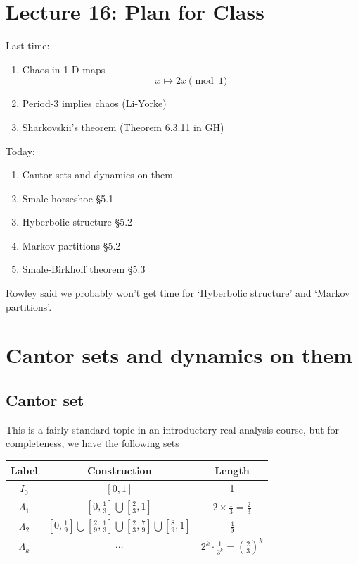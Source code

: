 \documentclass{article}
\begin{document}
\section{Lecture 16: Plan for Class}
Last time:
\begin{enumerate}
    \item Chaos in 1-D maps \[ x\mapsto 2x \pmod 1 \]
    \item Period-3 implies chaos (Li-Yorke)
    \item Sharkovskii's theorem (Theorem 6.3.11 in GH)
\end{enumerate}

Today:
\begin{enumerate}
    \item Cantor-sets and dynamics on them 
    \item Smale horseshoe \S 5.1
    \item Hyberbolic structure \S 5.2
    \item Markov partitions \S 5.2
    \item Smale-Birkhoff theorem \S 5.3
\end{enumerate}
Rowley said we probably won't get time for `Hyberbolic structure' and `Markov partitions'.

\section{Cantor sets and dynamics on them}

\subsection{Cantor set}

This is a fairly standard topic in an introductory real analysis course, but for completeness, we have the following sets 

\begin{table}[h!]
    \centering
    \begin{tabular}{|c|c|c|}
    \hline
    Label & Construction & Length \\
    \hline
    $I_0$ & $[0,1]$ & 1 \\
    $\Lambda_1$ & $[0,\frac{1}{3}]\bigcup [\frac{2}{3},1]$ & $2\times\frac{1}{3}=\frac{2}{3}$ \\
    $\Lambda_2$ & $[0,\frac{1}{9}]\bigcup [\frac{2}{9},\frac{1}{3}] \bigcup [\frac{2}{3},\frac{7}{9}]\bigcup [\frac{8}{9},1]$ & $\frac{4}{9}$ \\
    $\Lambda_k$ & $\cdots$ & $2^k \cdot \frac{1}{3^k}=\left(\frac{2}{3}\right)^k$\\
    \hline
    \end{tabular}
\end{table}
\end{document}
